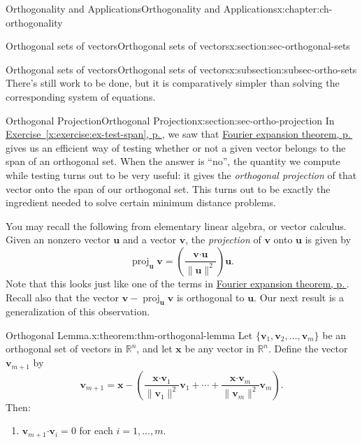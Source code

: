 \documentclass[oneside,10pt,]{book}
\newcommand{\xreffont}{\relax}
\numberwithin{equation}{section}
\newcommand{\R}{\mathbb{R}}
\newcommand{\dotp}{\!\boldsymbol{\cdot}\!}
\newcommand{\len}[1]{\lVert #1\rVert}
\newcommand{\proj}[2]{\operatorname{proj}_{#1}{#2}}
\newcommand{\uu}{\mathbf{u}}
\newcommand{\vv}{\mathbf{v}}
\newcommand{\xx}{\mathbf{x}}
\begin{document}
\begin{chapterptx}{Orthogonality and Applications}{}{Orthogonality and Applications}{}{}{x:chapter:ch-orthogonality}
\begin{sectionptx}{Orthogonal sets of vectors}{}{Orthogonal sets of vectors}{}{}{x:section:sec-orthogonal-sets}
\begin{subsectionptx}{Orthogonal sets of vectors}{}{Orthogonal sets of vectors}{}{}{x:subsection:subsec-ortho-sets}
\begin{equation*}
\end{equation*}
There's still work to be done, but it is comparatively simpler than solving the corresponding system of equations.%
\end{subsectionptx}
\end{sectionptx}
%
%
\typeout{************************************************}
\typeout{************************************************}
%
\begin{sectionptx}{Orthogonal Projection}{}{Orthogonal Projection}{}{}{x:section:sec-ortho-projection}
In \hyperref[x:exercise:ex-test-span]{Exercise~{\xreffont\ref{x:exercise:ex-test-span}}, p.\,\pageref{x:exercise:ex-test-span}}, we saw that \hyperref[x:theorem:thm-fourier-expansion]{Fourier expansion theorem, p.\,\pageref{x:theorem:thm-fourier-expansion}} gives us an efficient way of testing whether or not a given vector belongs to the span of an orthogonal set. When the answer is ``no'', the quantity we compute while testing turns out to be very useful: it gives the \emph{orthogonal projection} of that vector onto the span of our orthogonal set. This turns out to be exactly the ingredient needed to solve certain minimum distance problems.%
\par
You may recall the following from elementary linear algebra, or vector calculus. Given an nonzero vector \(\uu\) and a vector \(\vv\), the \emph{projection} of \(\vv\) onto \(\uu\) is given by%
\begin{equation*}
\proj{\uu}{\vv} = \left(\frac{\vv\dotp\uu}{\len{\uu}^2}\right)\uu\text{.}
\end{equation*}
Note that this looks just like one of the terms in \hyperref[x:theorem:thm-fourier-expansion]{Fourier expansion theorem, p.\,\pageref{x:theorem:thm-fourier-expansion}}. Recall also that the vector \(\vv-\proj{\uu}{\vv}\) is orthogonal to \(\uu\). Our next result is a generalization of this observation.%
\begin{theorem}{Orthogonal Lemma.}{}{x:theorem:thm-orthogonal-lemma}%
Let \(\{\vv_1,\vv_2,\ldots, \vv_m\}\) be an orthogonal set of vectors in \(\R^n\), and let \(\xx\) be any vector in \(\R^n\). Define the vector \(\vv_{m+1}\) by%
\begin{equation*}
\vv_{m+1} = \xx-\left(\frac{\xx\dotp\vv_1}{\len{\vv_1}^2}\vv_1+\cdots + \frac{\xx\dotp\vv_m}{\len{\vv_m}^2}\vv_m\right)\text{.}
\end{equation*}
Then:%
\begin{enumerate}
\item{}\(\vv_{m+1}\dotp \vv_i = 0\) for each \(i=1,\ldots, m\).%

\end{enumerate}
\end{theorem}
\end{sectionptx}
\end{chapterptx}
\end{document}
